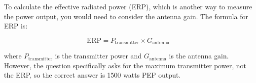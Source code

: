 To calculate the effective radiated power (ERP), which is another way to measure the power output, you would need to consider the antenna gain. The formula for ERP is:

\[
\text{ERP} = P_{\text{transmitter}} \times G_{\text{antenna}}
\]

where \( P_{\text{transmitter}} \) is the transmitter power and \( G_{\text{antenna}} \) is the antenna gain. However, the question specifically asks for the maximum transmitter power, not the ERP, so the correct answer is 1500 watts PEP output.


